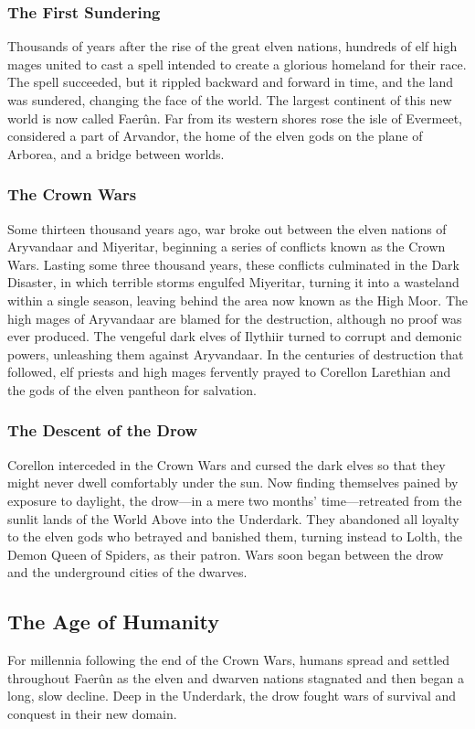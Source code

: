 \documentclass[10pt,a4paper,twoside,twocolumn,openany,bg=print,nodeprecatedcode]{dndbook}
\begin{document}
\subsubsection{The First Sundering}
Thousands of years after the rise of the great elven nations, hundreds of elf high mages united to cast a spell intended to create a glorious homeland for their race. The spell succeeded, but it rippled backward and forward in time, and the land was sundered, changing the face of the world. The largest continent of this new world is now called Faerûn. Far from its western shores rose the isle of Evermeet, considered a part of Arvandor, the home of the elven gods on the plane of Arborea, and a bridge between worlds.
\subsubsection{The Crown Wars}
Some thirteen thousand years ago, war broke out between the elven nations of Aryvandaar and Miyeritar, beginning a series of conflicts known as the Crown Wars. Lasting some three thousand years, these conflicts culminated in the Dark Disaster, in which terrible storms engulfed Miyeritar, turning it into a wasteland within a single season, leaving behind the area now known as the High Moor. The high mages of Aryvandaar are blamed for the destruction, although no proof was ever produced.
The vengeful dark elves of Ilythiir turned to corrupt and demonic powers, unleashing them against Aryvandaar. In the centuries of destruction that followed, elf priests and high mages fervently prayed to Corellon Larethian and the gods of the elven pantheon for salvation.
\subsubsection{The Descent of the Drow}
Corellon interceded in the Crown Wars and cursed the dark elves so that they might never dwell comfortably under the sun. Now finding themselves pained by exposure to daylight, the drow—in a mere two months' time—retreated from the sunlit lands of the World Above into the Underdark. They abandoned all loyalty to the elven gods who betrayed and banished them, turning instead to Lolth, the Demon Queen of Spiders, as their patron. Wars soon began between the drow and the underground cities of the dwarves.
\subsection{The Age of Humanity}
For millennia following the end of the Crown Wars, humans spread and settled throughout Faerûn as the elven and dwarven nations stagnated and then began a long, slow decline. Deep in the Underdark, the drow fought wars of survival and conquest in their new domain.
\end{document}
